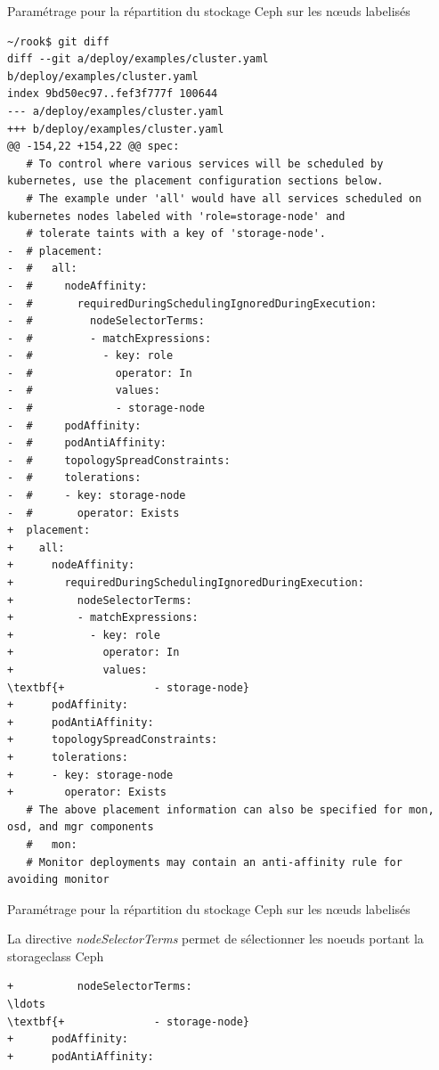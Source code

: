 
\begin{frame}[shrink=5,fragile]{Paramétrage pour la répartition du stockage Ceph sur les n\oe{}uds labelisés}

\begin{tiny}
\begin{Verbatim}[commandchars=\\\{\}]
~/rook$ git diff
diff --git a/deploy/examples/cluster.yaml b/deploy/examples/cluster.yaml
index 9bd50ec97..fef3f777f 100644
--- a/deploy/examples/cluster.yaml
+++ b/deploy/examples/cluster.yaml
@@ -154,22 +154,22 @@ spec:
   # To control where various services will be scheduled by kubernetes, use the placement configuration sections below.
   # The example under 'all' would have all services scheduled on kubernetes nodes labeled with 'role=storage-node' and
   # tolerate taints with a key of 'storage-node'.
-  # placement:
-  #   all:
-  #     nodeAffinity:
-  #       requiredDuringSchedulingIgnoredDuringExecution:
-  #         nodeSelectorTerms:
-  #         - matchExpressions:
-  #           - key: role
-  #             operator: In
-  #             values:
-  #             - storage-node
-  #     podAffinity:
-  #     podAntiAffinity:
-  #     topologySpreadConstraints:
-  #     tolerations:
-  #     - key: storage-node
-  #       operator: Exists
+  placement:
+    all:
+      nodeAffinity:
+        requiredDuringSchedulingIgnoredDuringExecution:
+          nodeSelectorTerms:
+          - matchExpressions:
+            - key: role
+              operator: In
+              values:
\textbf{+              - storage-node}
+      podAffinity:
+      podAntiAffinity:
+      topologySpreadConstraints:
+      tolerations:
+      - key: storage-node
+        operator: Exists
   # The above placement information can also be specified for mon, osd, and mgr components
   #   mon:
   # Monitor deployments may contain an anti-affinity rule for avoiding monitor
\end{Verbatim}
\end{tiny}


\end{frame}


\begin{frame}[fragile]{Paramétrage pour la répartition du stockage Ceph sur les n\oe{}uds labelisés}

   La directive \textit{nodeSelectorTerms} permet de sélectionner les noeuds portant la storageclass Ceph

\begin{tiny}
\begin{Verbatim}[commandchars=\\\{\}]
+          nodeSelectorTerms:
\ldots
\textbf{+              - storage-node}
+      podAffinity:
+      podAntiAffinity:
\end{Verbatim}
\end{tiny}


\end{frame}

